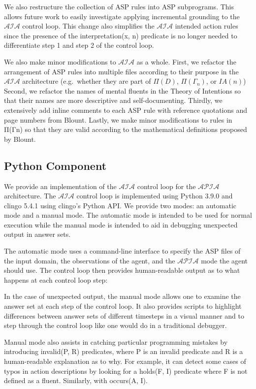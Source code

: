 We also restructure the collection of ASP rules into ASP subprograms.
This allows future work to easily investigate applying incremental grounding to the $\mathcal{AIA}$ control loop.
This change also simplifies the $\mathcal{AIA}$ intended action rules since the presence of the interpretation(x, n) predicate is no longer needed to differentiate step 1 and step 2 of the control loop.

We also make minor modifications to $\mathcal{AIA}$ as a whole.
First, we refactor the arrangement of ASP rules into multiple files according to their purpose in the $\mathcal{AIA}$ architecture (e.g.~whether they are part of $\Pi(D)$, $\Pi(\Gamma_n)$, or $IA(n)$)
Second, we refactor the names of mental fluents in the Theory of Intentions so that their names are more descriptive and self-documenting.
Thirdly, we extensively add inline comments to each ASP rule with reference quotations and page numbers from Blount.
Lastly, we make minor modifications to rules in Π(Γn) so that they are valid according to the mathematical definitions proposed by Blount.

\subsection{Python Component}

We provide an implementation of the $\mathcal{AIA}$ control loop for the $\mathcal{APIA}$ architecture.
The $\mathcal{AIA}$ control loop is implemented using Python 3.9.0 and clingo 5.4.1 using clingo's Python API.
We provide two modes: an automatic mode and a manual mode.
The automatic mode is intended to be used for normal execution while the manual mode is intended to aid in debugging unexpected output in answer sets.

The automatic mode uses a command-line interface to specify the ASP files of the input domain, the observations of the agent, and the $\mathcal{APIA}$ mode the agent should use.
The control loop then provides human-readable output as to what happens at each control loop step:


In the case of unexpected output, the manual mode allows one to examine the answer set at each step of the control loop.
It also provides scripts to highlight differences between answer sets of different timesteps in a visual manner and to step through the control loop like one would do in a traditional debugger.

Manual mode also assists in catching particular programming mistakes by introducing invalid(P, R) predicates, where P is an invalid predicate and R is a human-readable explanation as to why.
For example, it can detect some cases of typos in action descriptions by looking for a holds(F, I) predicate where F is not defined as a fluent.
Similarly, with occurs(A, I).

